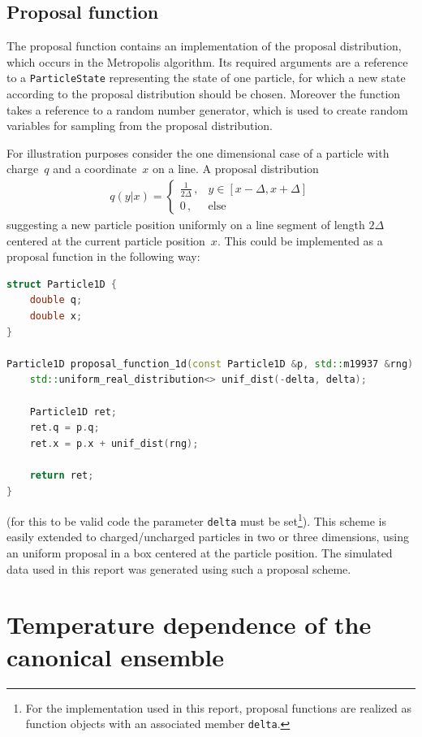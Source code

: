 \documentclass[11pt, a4paper]{article}
\numberwithin{equation}{section}
\begin{document}
\subsection{Proposal function} \label{sec:proposal_function}
The proposal function contains an implementation of the proposal distribution, which occurs in the Metropolis algorithm.
Its required arguments are a reference to a \texttt{ParticleState} representing the state of one particle, for which a new state according to the proposal distribution should be chosen.
Moreover the function takes a reference to a random number generator, which is used to create random variables for sampling from the proposal distribution.

For illustration purposes consider the one dimensional case of a particle with charge~$q$ and a coordinate~$x$ on a line.
A proposal distribution
\begin{align*}
	q(y|x) = \begin{cases}
		\frac{1}{2\Delta} \,, & y \in \left[x - \Delta, x + \Delta \right]\\
		0 \,, & \text{else}
	\end{cases}
\end{align*}
suggesting a new particle position uniformly on a line segment of length $2\Delta$ centered at the current particle position~$x$.
This could be implemented as a proposal function in the following way:
\begin{lstlisting}[language=C++]
struct Particle1D {
	double q;
	double x;
}

Particle1D proposal_function_1d(const Particle1D &p, std::m19937 &rng) {
	std::uniform_real_distribution<> unif_dist(-delta, delta);
	
	Particle1D ret;
	ret.q = p.q;
	ret.x = p.x + unif_dist(rng);
	
	return ret;
}
\end{lstlisting}
(for this to be valid code the parameter \texttt{delta} must be set\footnote{For the implementation used in this report, proposal functions are realized as function objects with an associated member \texttt{delta}.}).
This scheme is easily extended to charged/uncharged particles in two or three dimensions, using an uniform proposal in a box centered at the particle position.
The simulated data used in this report was generated using such a proposal scheme.


\section{Temperature dependence of the canonical ensemble} \label{sec:Temperature}
\end{document}
